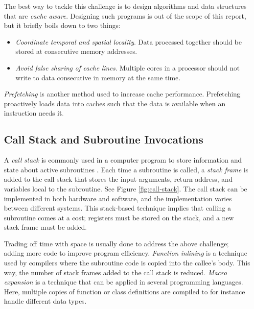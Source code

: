 The best way to tackle this challenge is to design algorithms and data structures that are \textit{cache aware}. Designing such programs is out of the scope of this report, but it briefly boils down to two things:
\begin{itemize}
  \item \textit{Coordinate temporal and spatial locality}. Data processed together should be stored at consecutive memory addresses.
  \item \textit{Avoid false sharing of cache lines}. Multiple cores in a processor should not write to data consecutive in memory at the same time.
\end{itemize}
\textit{Prefetching} is another method used to increase cache performance. Prefetching proactively loads data into caches such that the data is available when an instruction needs it.

\subsection{Call Stack and Subroutine Invocations}
\label{sub:Call Stack and Subroutine Invocations}

A \textit{call stack} is commonly used in a computer program to store information and state about active subroutines \cite{Wikipedia_contributors2015-od}. Each time a subroutine is called, a \textit{stack frame} is added to the call stack that stores the input arguments, return address, and variables local to the subroutine. See Figure \ref{fig:call-stack}. The call stack can be implemented in both hardware and software, and the implementation varies between different systems. This stack-based technique implies that calling a subroutine comes at a cost; registers must be stored on the stack, and a new stack frame must be added.

Trading off time with space is usually done to address the above challenge; adding more code to improve program efficiency. \textit{Function inlining} is a technique used by compilers where the subroutine code is copied into the callee's body. This way, the number of stack frames added to the call stack is reduced. \textit{Macro expansion} is a technique that can be applied in several programming languages. Here, multiple copies of function or class definitions are compiled to for instance handle different data types.

